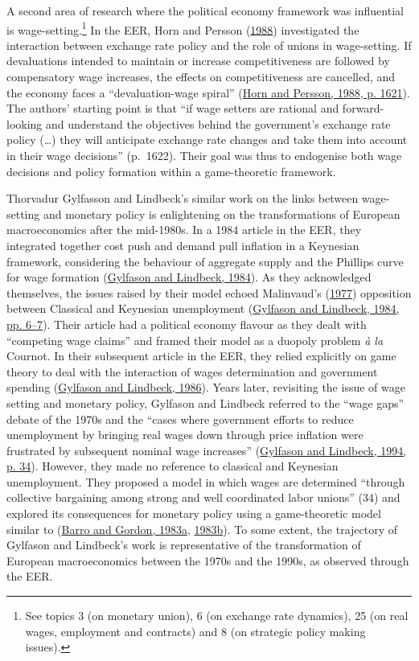 \documentclass[
  12pt,
  onecolumn]{article}
\begin{document}
A second area of research where the political economy framework was influential is wage-setting.\footnote{See topics 3 (on monetary union), 6 (on exchange rate dynamics), 25 (on real wages, employment and contracts) and 8 (on strategic policy making issues).} In the EER, Horn and Persson (\protect\hyperlink{ref-horn1988}{1988}) investigated the interaction between exchange rate policy and the role of unions in wage-setting. If devaluations intended to maintain or increase competitiveness are followed by compensatory wage increases, the effects on competitiveness are cancelled, and the economy faces a ``devaluation-wage spiral'' (\protect\hyperlink{ref-horn1988}{Horn and Persson, 1988, p. 1621}). The authors' starting point is that ``if wage setters are rational and forward-looking and understand the objectives behind the government's exchange rate policy (\ldots) they will anticipate exchange rate changes and take them into account in their wage decisions'' (p.~1622). Their goal was thus to endogenise both wage decisions and policy formation within a game-theoretic framework.

Thorvadur Gylfasson and Lindbeck's similar work on the links between wage-setting and monetary policy is enlightening on the transformations of European macroeconomics after the mid-1980s. In a 1984 article in the EER, they integrated together cost push and demand pull inflation in a Keynesian framework, considering the behaviour of aggregate supply and the Phillips curve for wage formation (\protect\hyperlink{ref-gylfason1984}{Gylfason and Lindbeck, 1984}). As they acknowledged themselves, the issues raised by their model echoed Malinvaud's (\protect\hyperlink{ref-malinvaud1977}{1977}) opposition between Classical and Keynesian unemployment (\protect\hyperlink{ref-gylfason1984}{Gylfason and Lindbeck, 1984, pp. 6--7}). Their article had a political economy flavour as they dealt with ``competing wage claims'' and framed their model as a duopoly problem \emph{à la} Cournot. In their subsequent article in the EER, they relied explicitly on game theory to deal with the interaction of wages determination and government spending (\protect\hyperlink{ref-gylfason1986}{Gylfason and Lindbeck, 1986}). Years later, revisiting the issue of wage setting and monetary policy, Gylfason and Lindbeck referred to the ``wage gaps'' debate of the 1970s and the ``cases where government efforts to reduce unemployment by bringing real wages down through price inflation were frustrated by subsequent nominal wage increases'' (\protect\hyperlink{ref-gylfason1994}{Gylfason and Lindbeck, 1994, p. 34}). However, they made no reference to classical and Keynesian unemployment. They proposed a model in which wages are determined ``through collective bargaining among strong and well coordinated labor unions'' (34) and explored its consequences for monetary policy using a game-theoretic model similar to (\protect\hyperlink{ref-barro1983}{Barro and Gordon, 1983a}, \protect\hyperlink{ref-barro1983c}{1983b}). To some extent, the trajectory of Gylfason and Lindbeck's work is representative of the transformation of European macroeconomics between the 1970s and the 1990s, as observed through the EER.
\end{document}
